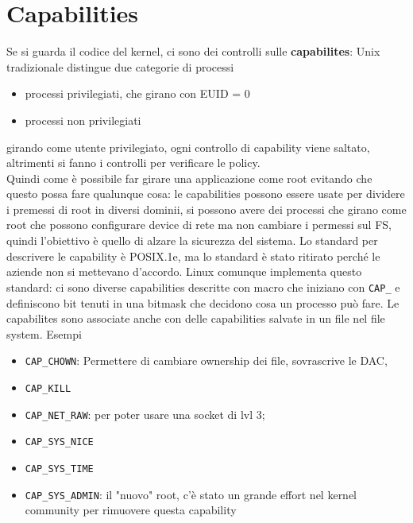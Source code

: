 \documentclass[12pt, oneside]{extbook} %
\begin{document}
\section{Capabilities}
Se si guarda il codice del kernel, ci sono dei controlli sulle \textbf{capabilites}: Unix tradizionale distingue due categorie di processi
\begin{itemize}
\item processi privilegiati, che girano con EUID = 0
\item processi non privilegiati
\end{itemize}
girando come utente privilegiato, ogni controllo di capability viene saltato, altrimenti si fanno i controlli per verificare le policy.\\Quindi come è possibile far girare una applicazione come root evitando che questo possa fare qualunque cosa: le capabilities possono essere usate per dividere i premessi di root in diversi dominii, si possono avere dei processi che girano come root che possono configurare device di rete ma non cambiare i permessi sul FS, quindi l'obiettivo è quello di alzare la sicurezza del sistema. Lo standard per descrivere le capability è POSIX.1e, ma lo standard è stato ritirato perché le aziende non si mettevano d'accordo. Linux comunque implementa questo standard: ci sono diverse capabilities descritte con macro che iniziano con \texttt{CAP\_} e definiscono bit tenuti in una bitmask che decidono cosa un processo può fare. Le capabilites sono associate anche con delle capabilities salvate in un file nel file system. Esempi
\begin{itemize}
\item \texttt{CAP\_CHOWN}: Permettere di cambiare ownership dei file, sovrascrive le DAC,
\item \texttt{CAP\_KILL}
\item \texttt{CAP\_NET\_RAW}: per poter usare una socket di lvl 3;
\item \texttt{CAP\_SYS\_NICE}
\item \texttt{CAP\_SYS\_TIME}
\item \texttt{CAP\_SYS\_ADMIN}: il "nuovo" root, c'è stato un grande effort nel kernel community per rimuovere questa capability
\end{itemize} 
\end{document}
